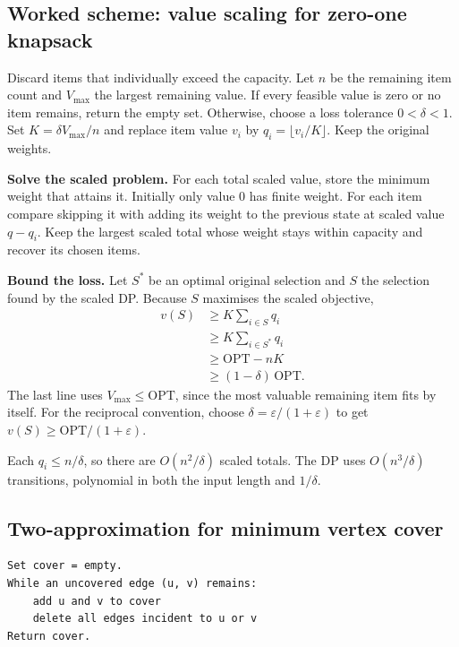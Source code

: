 \documentclass[12pt,a4paper]{article}
\begin{document}
\subsection{Worked scheme: value scaling for zero-one knapsack}
\begin{tcolorbox}[examplebox, title={Why value scaling gives an FPTAS}]
Discard items that individually exceed the capacity. Let $n$ be the remaining item count and $V_{\max}$ the largest remaining value. If every feasible value is zero or no item remains, return the empty set. Otherwise, choose a loss tolerance $0<\delta<1$. Set $K=\delta V_{\max}/n$ and replace item value $v_i$ by $q_i=\lfloor v_i/K\rfloor$. Keep the original weights.

\textbf{Solve the scaled problem.} For each total scaled value, store the minimum weight that attains it. Initially only value $0$ has finite weight. For each item compare skipping it with adding its weight to the previous state at scaled value $q-q_i$. Keep the largest scaled total whose weight stays within capacity and recover its chosen items.

\textbf{Bound the loss.} Let $S^*$ be an optimal original selection and $S$ the selection found by the scaled DP. Because $S$ maximises the scaled objective,
\begin{align*}
v(S)&\ge K\sum_{i\in S}q_i\\
    &\ge K\sum_{i\in S^*}q_i\\
    &\ge \mathrm{OPT}-nK\\
    &\ge (1-\delta)\,\mathrm{OPT}.
\end{align*}
The last line uses $V_{\max}\le\mathrm{OPT}$, since the most valuable remaining item fits by itself. For the reciprocal convention, choose $\delta=\varepsilon/(1+\varepsilon)$ to get $v(S)\ge\mathrm{OPT}/(1+\varepsilon)$.

Each $q_i\le n/\delta$, so there are $O(n^2/\delta)$ scaled totals. The DP uses $O(n^3/\delta)$ transitions, polynomial in both the input length and $1/\delta$.
\end{tcolorbox}

\subsection{Two-approximation for minimum vertex cover}
\begin{tcolorbox}[formulabox, title={Maximal-matching algorithm for vertex cover}]
\begin{verbatim}
Set cover = empty.
While an uncovered edge (u, v) remains:
    add u and v to cover
    delete all edges incident to u or v
Return cover.
\end{verbatim}
\end{tcolorbox}
\end{document}
